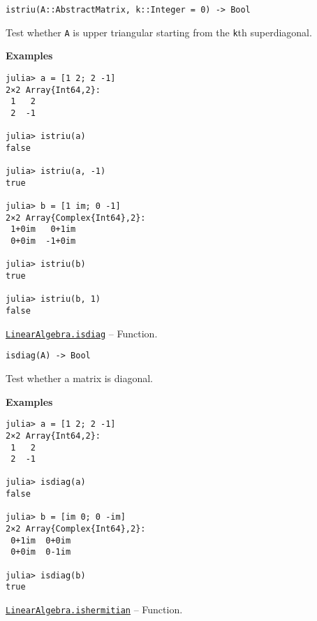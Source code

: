 \begin{adjustwidth}{2em}{0pt}


\begin{verbatim}
istriu(A::AbstractMatrix, k::Integer = 0) -> Bool
\end{verbatim}

Test whether \texttt{A} is upper triangular starting from the \texttt{k}th superdiagonal.

\textbf{Examples}


\begin{verbatim}
julia> a = [1 2; 2 -1]
2×2 Array{Int64,2}:
 1   2
 2  -1

julia> istriu(a)
false

julia> istriu(a, -1)
true

julia> b = [1 im; 0 -1]
2×2 Array{Complex{Int64},2}:
 1+0im   0+1im
 0+0im  -1+0im

julia> istriu(b)
true

julia> istriu(b, 1)
false
\end{verbatim}



\end{adjustwidth}
\hypertarget{13562995326026471446}{} 
\hyperlink{13562995326026471446}{\texttt{LinearAlgebra.isdiag}}  -- {Function.}

\begin{adjustwidth}{2em}{0pt}


\begin{verbatim}
isdiag(A) -> Bool
\end{verbatim}

Test whether a matrix is diagonal.

\textbf{Examples}


\begin{verbatim}
julia> a = [1 2; 2 -1]
2×2 Array{Int64,2}:
 1   2
 2  -1

julia> isdiag(a)
false

julia> b = [im 0; 0 -im]
2×2 Array{Complex{Int64},2}:
 0+1im  0+0im
 0+0im  0-1im

julia> isdiag(b)
true
\end{verbatim}



\end{adjustwidth}
\hypertarget{2319981190929881860}{} 
\hyperlink{2319981190929881860}{\texttt{LinearAlgebra.ishermitian}}  -- {Function.}

